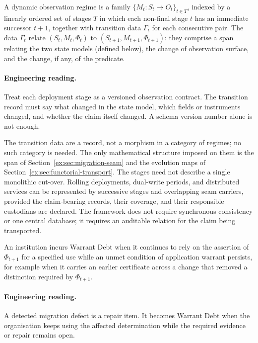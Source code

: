 \documentclass[twocolumn,envcountsect,envcountsame,natbib]{svjour3}
\begin{document}
\begin{definition}
A dynamic observation regime is a family $\{M_t:S_t\to O_t\}_{t \in T}$, indexed by a linearly ordered set of stages $T$ in which each non-final stage $t$ has an immediate successor $t+1$, together with transition data $\Gamma_t$ for each consecutive pair. The data $\Gamma_t$ relate $(S_t,M_t,\Phi_t)$ to $(S_{t+1},M_{t+1},\Phi_{t+1})$: they comprise a span relating the two state models (defined below), the change of observation surface, and the change, if any, of the predicate.
\end{definition}

\paragraph{Engineering reading.} Treat each deployment stage as a versioned observation contract. The transition record must say what changed in the state model, which fields or instruments changed, and whether the claim itself changed. A schema version number alone is not enough.

The transition data are a record, not a morphism in a category of regimes; no such category is needed. The only mathematical structure imposed on them is the span of Section~\ref{ex:sec:migration-seam} and the evolution maps of Section~\ref{ex:sec:functorial-transport}. The stages need not describe a single monolithic cut-over. Rolling deployments, dual-write periods, and distributed services can be represented by successive stages and overlapping seam carriers, provided the claim-bearing records, their coverage, and their responsible custodians are declared. The framework does not require synchronous consistency or one central database; it requires an auditable relation for the claim being transported.

\begin{definition}\label{ex:def:dynamic-debt}
An institution incurs Warrant Debt when it continues to rely on the assertion of $\Phi_{t+1}$ for a specified use while an unmet condition of application warrant persists, for example when it carries an earlier certificate across a change that removed a distinction required by $\Phi_{t+1}$.
\end{definition}

\paragraph{Engineering reading.} A detected migration defect is a repair item. It becomes Warrant Debt when the organisation keeps using the affected determination while the required evidence or repair remains open.
\end{document}
